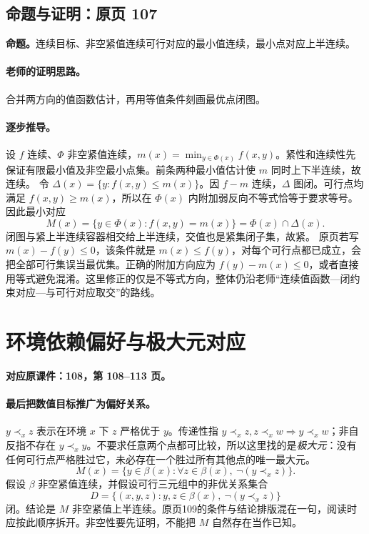 \subsection{命题与证明：原页 107}

\textbf{命题。}连续目标、非空紧值连续可行对应的最小值连续，最小点对应上半连续。

\paragraph{老师的证明思路。}合并两方向的值函数估计，再用等值条件刻画最优点闭图。

\paragraph{逐步推导。}
设 $f$ 连续、$\Phi$ 非空紧值连续，$m(x)=\min_{y\in\Phi(x)}f(x,y)$。紧性和连续性先保证有限最小值及非空最小点集。前条两种最小值估计使 $m$ 同时上下半连续，故连续。
令 $\Delta(x)=\{y:f(x,y)\le m(x)\}$。因 $f-m$ 连续，$\Delta$ 图闭。可行点均满足 $f(x,y)\ge m(x)$，所以在 $\Phi(x)$ 内附加弱反向不等式恰等于要求等号。因此最小对应
\[M(x)=\{y\in\Phi(x):f(x,y)=m(x)\}=\Phi(x)\cap\Delta(x).\]
闭图与紧上半连续容器相交给上半连续，交值也是紧集闭子集，故紧。
原页若写 $m(x)-f(y)\le0$，该条件就是 $m(x)\le f(y)$，对每个可行点都已成立，会把全部可行集误当最优集。正确的附加方向应为 $f(y)-m(x)\le0$，或者直接用等式避免混淆。这里修正的仅是不等式方向，整体仍沿老师“连续值函数—闭约束对应—与可行对应取交”的路线。


\clearpage\section{环境依赖偏好与极大元对应}\label{g:108:108}

\textbf{对应原课件：108，第 108--113 页。}


\paragraph{最后把数值目标推广为偏好关系。}
$y\prec_x z$ 表示在环境 $x$ 下 $z$ 严格优于 $y$。传递性指 $y\prec_x z,z\prec_x w\Rightarrow y\prec_x w$；非自反指不存在 $y\prec_x y$。不要求任意两个点都可比较，所以这里找的是\emph{极大元}：没有任何可行点严格胜过它，未必存在一个胜过所有其他点的唯一最大元。
\[M(x)=\{y\in\beta(x):\forall z\in\beta(x),\ \neg(y\prec_x z)\}.
\]
假设 $\beta$ 非空紧值连续，并假设可行三元组中的非优关系集合
\[D=\{(x,y,z):y,z\in\beta(x),\ \neg(y\prec_x z)\}
\]
闭。结论是 $M$ 非空紧值上半连续。原页109的条件与结论排版混在一句，阅读时应按此顺序拆开。非空性要先证明，不能把 $M$ 自然存在当作已知。

